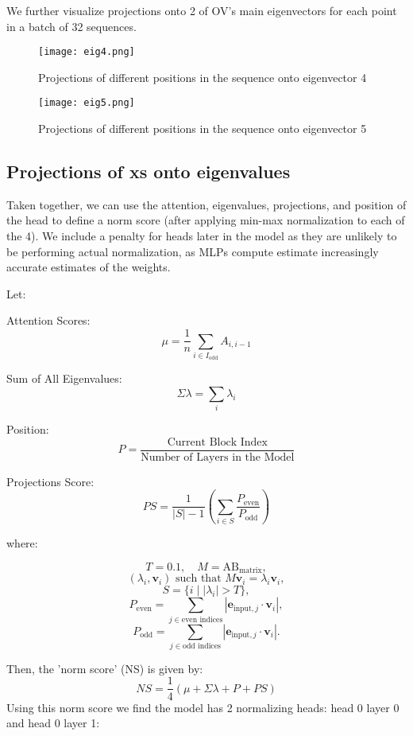 \documentclass{article}
\begin{document}
We further visualize projections onto 2 of OV’s main eigenvectors for each point in a batch of 32 sequences.

\begin{figure}[htbp]
\centering
\texttt{[image: eig4.png]}
\caption{Projections of different positions in the sequence onto eigenvector 4}
\end{figure}

\begin{figure}[htbp]
\centering
\texttt{[image: eig5.png]}
\caption{Projections of different positions in the sequence onto eigenvector 5}
\end{figure}


\subsection{Projections of xs onto eigenvalues}
Taken together, we can use the attention, eigenvalues, projections, and position of the head to define a norm score (after applying min-max normalization to each of the 4). We include a penalty for heads later in the model as they are unlikely to be performing actual normalization, as MLPs compute estimate increasingly accurate estimates of the weights.

Let:

Attention Scores: 
$$\mu=\frac{1}{n} \sum_{i \in I_{\mbox{odd}}} A_{i, i-1}$$

Sum of All Eigenvalues: 
$$\Sigma \lambda=\sum_i \lambda_i$$

Position: 
$$P=\frac{\mbox{Current Block Index}}{\mbox{Number of Layers in the Model}}$$

Projections Score: 
$$PS=\frac{1}{|S|-1}\left(\sum_{i \in S} \frac{P_{\mbox{even}}}{P_{\mbox{odd}}}\right)$$

where:

$$
T = 0.1, \quad M=\mathrm{AB}_{\mbox{matrix}},
$$
$$
(\lambda_i, \mathbf{v}_i) \mbox{ such that } M \mathbf{v}_i=\lambda_i \mathbf{v}_i,
$$
$$
S = \{i \mid |\lambda_i| > T\},
$$
$$
P_{\mbox{even}} = \sum_{j \in \mbox{even indices}}|\mathbf{e}_{\mbox{input}, j} \cdot \mathbf{v}_i|,
$$
$$
P_{\mbox{odd}} = \sum_{j \in \mbox{odd indices}}|\mathbf{e}_{\mbox{input}, j} \cdot \mathbf{v}_i|.
$$

Then, the 'norm score' (NS) is given by:
$$
NS=\frac{1}{4}(\mu+\Sigma \lambda+P+PS)
$$
Using this norm score we find the model has 2 normalizing heads: head 0 layer 0 and head 0 layer 1:
\end{document}
